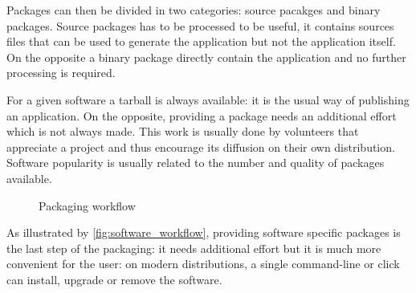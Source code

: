 Packages can then be divided in two categories: source pacakges and
binary packages. Source packages has to be processed to be useful, it
contains sources files that can be used to generate the application
but not the application itself. On the opposite a binary package
directly contain the application and no further processing is
required.


For a given software a tarball is always available: it is the usual
way of publishing an application. On the opposite, providing a package
needs an additional effort which is not always made. This work is
usually done by volunteers that appreciate a project and thus
encourage its diffusion on their own distribution. Software popularity
is usually related to the number and quality of packages available.

\begin{figure}[htbp]
\centering
{}
\caption{Packaging workflow}
\label{fig:software_workflow}
\end{figure}

As illustrated by \autoref{fig:software_workflow}, providing software
specific packages is the last step of the packaging: it needs
additional effort but it is much more convenient for the user: on
modern distributions, a single command-line or click can install,
upgrade or remove the software.



